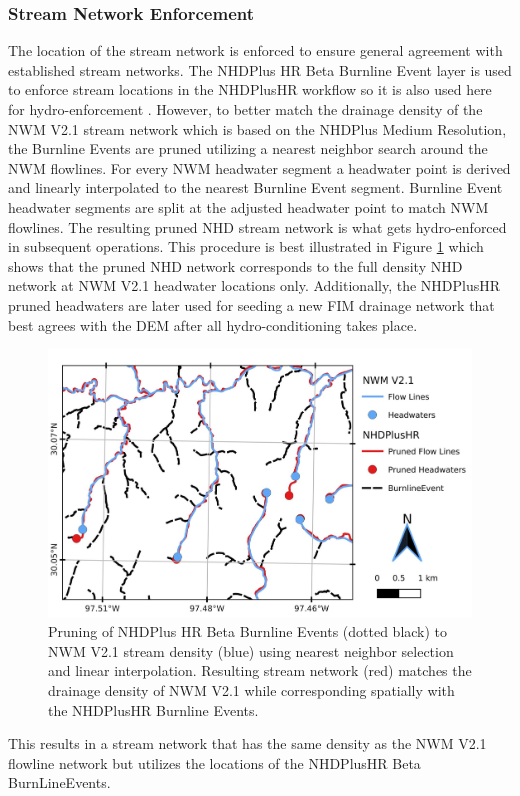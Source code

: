 \subsubsection{Stream Network Enforcement} 
\label{ssec:stream_network_enforcment}
%
The location of the stream network is enforced to ensure general agreement with established stream networks.
The NHDPlus HR Beta Burnline Event layer is used to enforce stream locations in the NHDPlusHR workflow so it is also used here for hydro-enforcement \cite{moore2019user}. 
However, to better match the drainage density of the NWM V2.1 stream network which is based on the NHDPlus Medium Resolution, the Burnline Events are pruned utilizing a nearest neighbor search around the NWM flowlines.
For every NWM headwater segment a headwater point is derived and linearly interpolated to the nearest Burnline Event segment.
Burnline Event headwater segments are split at the adjusted headwater point to match NWM flowlines.
The resulting pruned NHD stream network is what gets hydro-enforced in subsequent operations.
This procedure is best illustrated in Figure \ref{fig:stream_density_pruning} which shows that the pruned NHD network corresponds to the full density NHD network at NWM V2.1 headwater locations only. 
Additionally, the NHDPlusHR pruned headwaters are later used for seeding a new FIM drainage network that best agrees with the DEM after all hydro-conditioning takes place.
%
\begin{figure}[h!]
\centering
\includegraphics[scale=1.0]{figures/headwaters.jpg}
\caption{Pruning of NHDPlus HR Beta Burnline Events (dotted black) to NWM V2.1 stream density (blue) using nearest neighbor selection and linear interpolation. Resulting stream network (red) matches the drainage density of NWM V2.1 while corresponding spatially with the NHDPlusHR Burnline Events.}
\label{fig:stream_density_pruning}
\end{figure}
%
This results in a stream network that has the same density as the NWM V2.1 flowline network but utilizes the locations of the NHDPlusHR Beta BurnLineEvents. 

